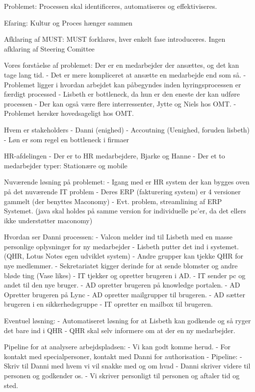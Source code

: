 \begin{linenumbers*}
Problemet: Processen skal identificeres, automatiseres og effektiviseres.

Efaring: Kultur og Proces hænger sammen

Afklaring af MUST:
MUST forklares, hver enkelt fase introduceres.
Ingen afklaring af Steering Comittee


Vores forståelse af problemet:
Der er en medarbejder der ansættes, og det kan tage lang tid.
	- Det er mere kompliceret at ansætte en medarbejde end som så.
	- Problemet ligger i hvordan arbejdet kan påbegyndes inden hyringsprocessen er færdigt processed
	- Lisbeth er bottleneck, da hun er den eneste der kan udføre processen
	- Der kan også være flere interressenter, Jytte og Niels hos OMT.
	- Problemet hersker hovedsageligt hos OMT.

Hvem er stakeholders
	- Danni (enighed)
	- Accoutning (Uenighed, foruden lisbeth)
	- Løn er som regel en bottleneck i firmaer

HR-afdelingen
	- Der er to HR medarbejdere, Bjarke og Hanne
	- Der et to medarbejder typer: Stationære og mobile

Nuværende løsning på problemet:
	- Igang med er HR system der kan bygges oven på det nuværende IT problem
	- Deres ERP (fakturering system) er 4 versioner gammelt (der benyttes Maconomy)
	- Evt. problem, streamlining af ERP Systemet. (java skal holdes på samme version for individuelle pc'er, da det ellers ikke understøtter maconomy)

Hvordan ser Danni processen:
	- Valcon melder ind til Lisbeth med en masse personlige oplysninger for ny medarbejder
	- Lisbeth putter det ind i systemet. (QHR, Lotus Notes egen udviklet system)
	- Andre grupper kan tjekke QHR for nye medlemmer.
		- Sekretariatet kigger derinde for at sende blomster og andre bløde ting (Vase likes)
		- IT tjekker og opretter brugeren i AD.
		- IT sender pc og andet til den nye bruger.
	- AD opretter brugeren på knowledge portalen.
	- AD Opretter brugeren på Lync
	- AD opretter mailgrupper til brugeren.
	- AD sætter brugeren i en sikkerhedsgruppe
	- IT opretter en mailbox til brugeren.

Eventuel løsning:
	- Automatiseret løsning for at Lisbeth kan godkende og så ryger det bare ind i QHR
	- QHR skal selv informere om at der en ny medarbejder.


Pipeline for at analysere arbejdspladsen:
	- Vi kan godt komme herud.
	- For kontakt med specialpersoner, kontakt med Danni for authorisation
	- Pipeline:
		- Skriv til Danni med hvem vi vil snakke med og om hvad
		- Danni skriver videre til personen og godkender os.
		- Vi skriver personligt til personen og aftaler tid og sted.


\end{linenumbers*}
